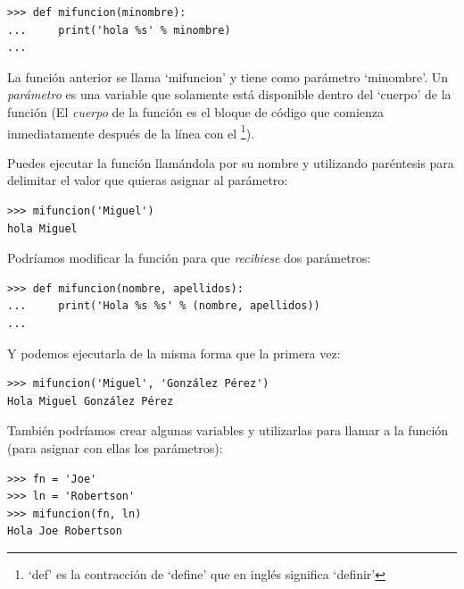 \begin{listing}
\begin{verbatim}
>>> def mifuncion(minombre):
...     print('hola %s' % minombre)
...
\end{verbatim}
\end{listing}

La función anterior se llama `mifuncion' y tiene como parámetro `minombre'.  Un \emph{parámetro} es una variable que solamente está disponible dentro del `cuerpo' de la función (El \emph{cuerpo} de la función es el bloque de código que comienza inmediatamente después de la línea con el \footnote{`def' es la contracción de `define' que en inglés significa `definir'}).

Puedes ejecutar la función llamándola por su nombre y utilizando paréntesis para delimitar el valor que quieras asignar al parámetro:

\begin{listing}
\begin{verbatim}
>>> mifuncion('Miguel')
hola Miguel
\end{verbatim}
\end{listing}

\noindent
Podríamos modificar la función para que \emph{recibiese} dos parámetros: 

\begin{listing}
\begin{verbatim}
>>> def mifuncion(nombre, apellidos):
...     print('Hola %s %s' % (nombre, apellidos))
...
\end{verbatim}
\end{listing}

\noindent
Y podemos ejecutarla de la misma forma que la primera vez:

\begin{listing}
\begin{verbatim}
>>> mifuncion('Miguel', 'González Pérez')
Hola Miguel González Pérez
\end{verbatim}
\end{listing}

\noindent
También podríamos crear algunas variables y utilizarlas para llamar a la función (para asignar con ellas los parámetros):

\begin{listing}
\begin{verbatim}
>>> fn = 'Joe'
>>> ln = 'Robertson'
>>> mifuncion(fn, ln)
Hola Joe Robertson
\end{verbatim}
\end{listing}

